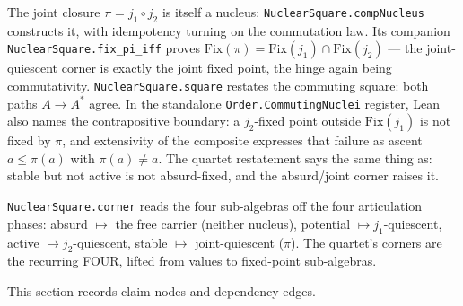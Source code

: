 \begin{theorem}\label{thm:nuclear-quartet}\leanok{}
The joint closure $\pi = j_1 \circ j_2$ is itself a nucleus: \texttt{NuclearSquare.compNucleus} constructs it, with idempotency turning on the commutation law. Its companion \texttt{NuclearSquare.fix\_pi\_iff} proves $\mathrm{Fix}(\pi) = \mathrm{Fix}(j_1) \cap \mathrm{Fix}(j_2)$ --- the joint-quiescent corner is exactly the joint fixed point, the hinge again being commutativity. \texttt{NuclearSquare.square} restates the commuting square: both paths $A \to A^{*}$ agree. In the standalone \texttt{Order.CommutingNuclei} register, Lean also names the contrapositive boundary: a $j_2$-fixed point outside $\mathrm{Fix}(j_1)$ is not fixed by $\pi$, and extensivity of the composite expresses that failure as ascent $a\le\pi(a)$ with $\pi(a)\ne a$. The quartet restatement says the same thing as: stable but not active is not absurd-fixed, and the absurd/joint corner raises it.
\end{theorem}
\begin{proposition}\label{thm:quartet-corner}\leanok{}
\texttt{NuclearSquare.corner} reads the four sub-algebras off the four articulation phases: absurd $\mapsto$ the free carrier (neither nucleus), potential $\mapsto j_1$-quiescent, active $\mapsto j_2$-quiescent, stable $\mapsto$ joint-quiescent ($\pi$). The quartet's corners are the recurring FOUR, lifted from values to fixed-point sub-algebras.
\end{proposition}

This section records claim nodes and dependency edges.

